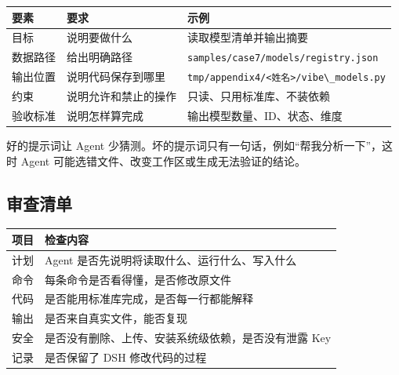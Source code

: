\begin{longtable}[]{@{}
  >{\raggedright\arraybackslash}p{}
  >{\raggedright\arraybackslash}p{}
  >{\raggedright\arraybackslash}p{}@{}}
\toprule\noalign{}
\begin{minipage}[b]{\linewidth}\raggedright
要素
\end{minipage} & \begin{minipage}[b]{\linewidth}\raggedright
要求
\end{minipage} & \begin{minipage}[b]{\linewidth}\raggedright
示例
\end{minipage} \\
\midrule\noalign{}
\endhead
\bottomrule\noalign{}
\endlastfoot
目标 & 说明要做什么 & 读取模型清单并输出摘要 \\
数据路径 & 给出明确路径 &
\passthrough{\lstinline!samples/case7/models/registry.json!} \\
输出位置 & 说明代码保存到哪里 &
\passthrough{\lstinline!tmp/appendix4/<姓名>/vibe\_models.py!} \\
约束 & 说明允许和禁止的操作 & 只读、只用标准库、不装依赖 \\
验收标准 & 说明怎样算完成 & 输出模型数量、ID、状态、维度 \\
\end{longtable}

好的提示词让 Agent
少猜测。坏的提示词只有一句话，例如``帮我分析一下''，这时 Agent
可能选错文件、改变工作区或生成无法验证的结论。

\subsection{审查清单}\label{ux5ba1ux67e5ux6e05ux5355}

\begin{longtable}[]{@{}ll@{}}
\toprule\noalign{}
项目 & 检查内容 \\
\midrule\noalign{}
\endhead
\bottomrule\noalign{}
\endlastfoot
计划 & Agent 是否先说明将读取什么、运行什么、写入什么 \\
命令 & 每条命令是否看得懂，是否修改原文件 \\
代码 & 是否能用标准库完成，是否每一行都能解释 \\
输出 & 是否来自真实文件，能否复现 \\
安全 & 是否没有删除、上传、安装系统级依赖，是否没有泄露 Key \\
记录 & 是否保留了 DSH 修改代码的过程 \\
\end{longtable}

